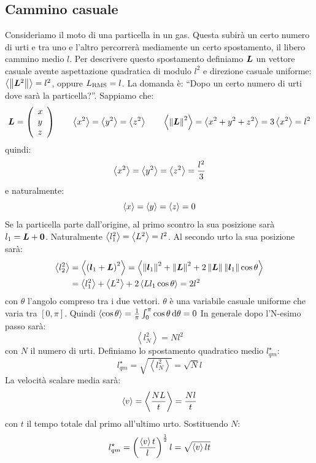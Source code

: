 \subsection{Cammino casuale}
Consideriamo il moto di una particella in un gas. Questa subirà un certo numero di urti e tra uno e l'altro percorrerà mediamente un certo spostamento, il libero cammino medio $l$. Per descrivere questo spostamento definiamo $\boldsymbol{L}$ un vettore casuale avente aspettazione quadratica di modulo $l^2$ e direzione casuale uniforme: $\left<\left\lVert\boldsymbol{L}^2\right\rVert\right>=l^2$, oppure $L_{\textup{RMS}}=l$. La domanda è: ``Dopo un certo numero di urti dove sarà la particella?''.
Sappiamo che:
\[
	\boldsymbol{L}=\left(
	\begin{array}{l}
			x \\y\\z\\
		\end{array}\right)
	\qquad\left<x^2\right>=\left<y^2\right>=\left<z^2\right>\qquad \left<\left\lVert\boldsymbol{L}\right\rVert^2\right>=\left<x^2+y^2+z^2\right>=3\left<x^2\right>=l^2
\]
quindi:
\begin{equation}
	\left<x^2\right>=\left<y^2\right>=\left<z^2\right>=\frac{l^2}{3}
\end{equation}
e naturalmente:
\begin{equation}
	\left<x\right>=\left<y\right>=\left<z\right>=0
\end{equation}
Se la particella parte dall'origine, al primo scontro la sua posizione sarà $l_1=\boldsymbol{L} + \boldsymbol{0}$. Naturalmente $\left<l_1^2\right>=\left<L^2\right>=l^2$. Al secondo urto la sua posizione sarà:
\begin{equation}
	\begin{split}
		\left<l_2^2\right>&=\left<\left(\boldsymbol{l}_1+\boldsymbol{L}\right)^2\right>=\left<\left\lVert\boldsymbol{l}_1\right\rVert^2+\left\lVert\boldsymbol{L}\right\rVert^2+2\left\lVert\boldsymbol{L}\right\rVert\left\lVert\boldsymbol{l}_1\right\rVert\cos\theta\right>\\
		&=\left<l_1^2\right>+\left<L^2\right>+2\left<Ll_1\cos\theta\right>=2l^2
	\end{split}
\end{equation}
con $\theta$ l'angolo compreso tra i due vettori. $\theta$ è una variabile casuale uniforme che varia tra $[0,\pi]$. Quindi $\left<\cos\theta\right>=\frac{1}{\pi}\int_0^\pi\cos\theta\,\mathrm{d}\theta=0$
In generale dopo l'N-esimo passo sarà:
\begin{equation}
	\left<l_N^2\right>=Nl^2
\end{equation}
con $N$ il numero di urti. Definiamo lo spostamento quadratico medio $l_{qm}^\star$:
\begin{equation}
	l_{qm}^\star =\sqrt{\left<l_N^2\right>} = \sqrt{N}l
\end{equation}
La velocità scalare media sarà:
\begin{equation}
	\left<v\right> = \left<\frac{NL}{t}\right>=\frac{Nl}{t}
\end{equation}
con $t$ il tempo totale dal primo all'ultimo urto. Sostituendo $N$:
\begin{equation}
	l_{qm}^\star = \left(\frac{\left<v\right>t}{l}\right)^{\frac{1}{2}}l=\sqrt{\left<v\right>lt}
\end{equation}
